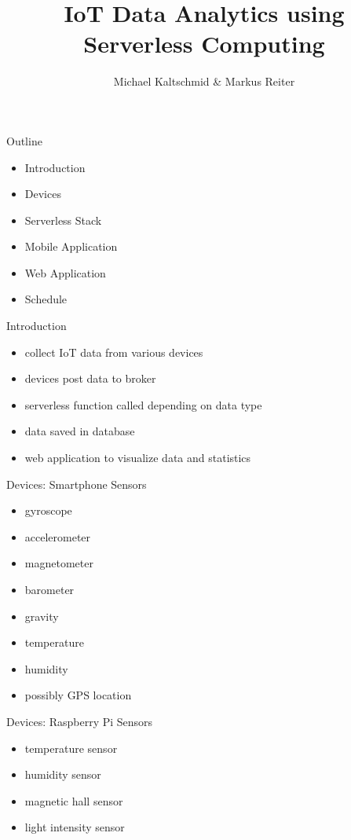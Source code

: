 \documentclass[aspectratio=1610]{beamer}
\title{IoT Data Analytics using Serverless Computing}
\author{Michael Kaltschmid \& Markus Reiter}
\date{}
\begin{document}
  \maketitle

  \begin{frame}{Outline}
    \begin{itemize}
      \item Introduction
      \item Devices
      \item Serverless Stack
      \item Mobile Application
      \item Web Application
      \item Schedule
    \end{itemize}
  \end{frame}

  \begin{frame}{Introduction}
    \begin{itemize}
      \item collect IoT data from various devices
      \item devices post data to broker
      \item serverless function called depending on data type
      \item data saved in database
      \item web application to visualize data and statistics
    \end{itemize}
  \end{frame}

  \begin{frame}{Devices: Smartphone}
    Sensors

    \begin{itemize}
      \item gyroscope
      \item accelerometer
      \item magnetometer
      \item barometer
      \item gravity
      \item temperature
      \item humidity
      \item possibly GPS location
    \end{itemize}
  \end{frame}

  \begin{frame}{Devices: Raspberry Pi}
    Sensors

    \begin{itemize}
      \item temperature sensor
      \item humidity sensor
      \item magnetic hall sensor
      \item light intensity sensor
    \end{itemize}
  \end{frame}
\end{document}
